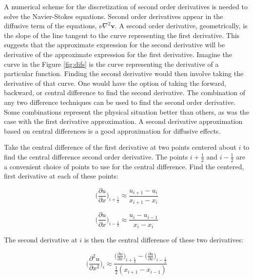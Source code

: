 \documentclass[twocolumn,12pth]{article}
\begin{document}
A numerical scheme for the discretization of second order derivatives is needed to solve the Navier-Stokes equations.
Second order derivatives appear in the diffusive term of the equations, $\nu\nabla^2\mathbf{v}$.
A second order derivative, geometrically, is the slope of the line tangent to the curve representing the first derivative.
This suggests that the approximate expression for the second derivative will be derivative of the approximate expression for the first derivative.
Imagine the curve in the Figure \ref{fig:difs} is the curve representing the derivative of a particular function. 
Finding the second derivative would then involve taking the derivative of that curve.
One would have the option of taking the forward, backward, or central difference to find the second derivative. 
The combination of any two difference techniques can be used to find the second order derivative.
Some combinations represent the physical situation better than others, as was the case with the first derivative approximation.
A second derivative approximation based on central differences is a good approximation for diffusive effects.

Take the central difference of the first derivative at two points centered about $i$ to find the central difference second order derivative.
The points $i + \frac{1}{2}$ and $i - \frac{1}{2}$ are a convenient choice of points to use for the central difference.
Find the centered, first derivative at each of these points:

\begin{equation}
\bigg(\frac{\partial{u}}{\partial{x}}\bigg)_{i + \frac{1}{2}} \approx \frac{u_{i+1} - u_i}{x_{i+1} - x_i}
\label{eq:11}
\end{equation}

\begin{equation}
\bigg(\frac{\partial{u}}{\partial{x}}\bigg)_{i - \frac{1}{2}} \approx \frac{u_{i} - u_{i-1}}{x_{i} - x_{i}}
\label{eq:12}
\end{equation}

The second derivative at $i$ is then the central difference of these two derivatives:

\begin{equation}
\bigg(\frac{\partial^2{u}}{\partial{x^2}}\bigg)_{i} \approx \frac{\big(\frac{\partial{u}}{\partial{x}}\big)_{i + \frac{1}{2}} -  \big(\frac{\partial{u}}{\partial{x}}\big)_{i - \frac{1}{2}}}{\frac{1}{2}(x_{i+1} - x_{i-1})}
\label{eq:13}
\end{equation}
\end{document}
